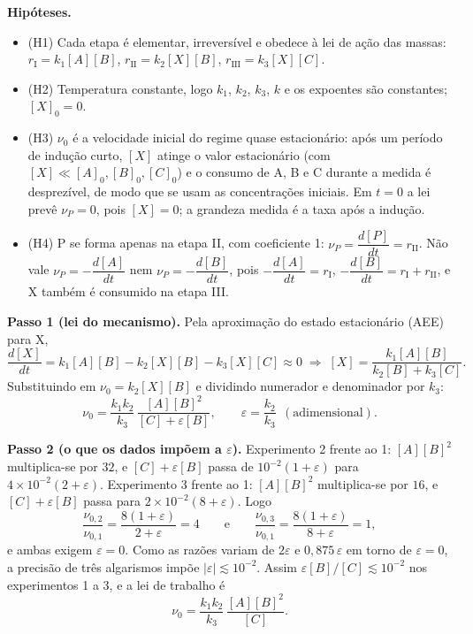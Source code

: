 \documentclass{article}%
\begin{document}
\textbf{Hipóteses.}
\begin{itemize}
\item (H1) Cada etapa é elementar, irreversível e obedece à lei de ação das massas: $r_{\mathrm{I}}=k_1[A][B]$, $r_{\mathrm{II}}=k_2[X][B]$, $r_{\mathrm{III}}=k_3[X][C]$.
\item (H2) Temperatura constante, logo $k_1$, $k_2$, $k_3$, $k$ e os expoentes são constantes; $[X]_0=0$.
\item (H3) $\nu_0$ é a velocidade inicial do regime quase estacionário: após um período de indução curto, $[X]$ atinge o valor estacionário (com $[X]\ll[A]_0,[B]_0,[C]_0$) e o consumo de A, B e C durante a medida é desprezível, de modo que se usam as concentrações iniciais. Em $t=0$ a lei prevê $\nu_P=0$, pois $[X]=0$; a grandeza medida é a taxa após a indução.
\item (H4) P se forma apenas na etapa II, com coeficiente 1: $\nu_P=\dfrac{d[P]}{dt}=r_{\mathrm{II}}$. Não vale $\nu_P=-\dfrac{d[A]}{dt}$ nem $\nu_P=-\dfrac{d[B]}{dt}$, pois $-\dfrac{d[A]}{dt}=r_{\mathrm{I}}$, $-\dfrac{d[B]}{dt}=r_{\mathrm{I}}+r_{\mathrm{II}}$, e X também é consumido na etapa III.
\end{itemize}

\textbf{Passo 1 (lei do mecanismo).} Pela aproximação do estado estacionário (AEE) para X,
\[ \frac{d[X]}{dt}=k_1[A][B]-k_2[X][B]-k_3[X][C]\approx0 \;\Rightarrow\; [X]=\frac{k_1[A][B]}{k_2[B]+k_3[C]}. \]
Substituindo em $\nu_0=k_2[X][B]$ e dividindo numerador e denominador por $k_3$:
\[ \nu_0=\frac{k_1k_2}{k_3}\,\frac{[A][B]^2}{[C]+\varepsilon[B]}, \qquad \varepsilon=\frac{k_2}{k_3}\ \ (\text{adimensional}). \]

\textbf{Passo 2 (o que os dados impõem a $\varepsilon$).} Experimento 2 frente ao 1: $[A][B]^2$ multiplica-se por $32$, e $[C]+\varepsilon[B]$ passa de $10^{-2}(1+\varepsilon)$ para $4\times10^{-2}(2+\varepsilon)$. Experimento 3 frente ao 1: $[A][B]^2$ multiplica-se por $16$, e $[C]+\varepsilon[B]$ passa para $2\times10^{-2}(8+\varepsilon)$. Logo
\[ \frac{\nu_{0,2}}{\nu_{0,1}}=\frac{8(1+\varepsilon)}{2+\varepsilon}=4 \qquad\text{e}\qquad \frac{\nu_{0,3}}{\nu_{0,1}}=\frac{8(1+\varepsilon)}{8+\varepsilon}=1, \]
e ambas exigem $\varepsilon=0$. Como as razões variam de $2\varepsilon$ e $0{,}875\,\varepsilon$ em torno de $\varepsilon=0$, a precisão de três algarismos impõe $|\varepsilon|\lesssim10^{-2}$. Assim $\varepsilon[B]/[C]\lesssim10^{-2}$ nos experimentos 1 a 3, e a lei de trabalho é
\[ \nu_0=\frac{k_1k_2}{k_3}\,\frac{[A][B]^2}{[C]}. \]
\end{document}
